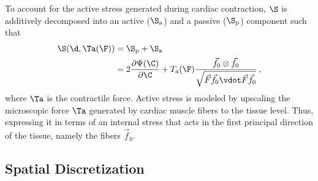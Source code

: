 To account for the active stress generated during cardiac contraction, $\S$ is additively decomposed into an active ($\S_\mathrm{a}$) and a passive ($\S_\mathrm{p}$) component such that
\begin{align}
    \S(\d, \Ta(\F)) &= \S_\mathrm{p} + \S_\mathrm{a} \label{eq:activeStress} \\
     &= 2 \frac{\partial \Psi(\C)}{\partial \C} + T_\text{a}(\F) \frac{\vec f_0 \otimes \vec f_0}{\sqrt{\vec F \vec f_0 \vdot \vec F \vec f_0}} \,, \nonumber
\end{align}
where $\Ta$ is the contractile force. 
Active stress is modeled by upscaling the microscopic force $\Ta$ generated by cardiac muscle fibers to the tissue level.
Thus, expressing it in terms of an internal stress that acts in the first principal direction of the tissue, namely the fibers $\vec f_0$.

\subsection{Spatial Discretization}

